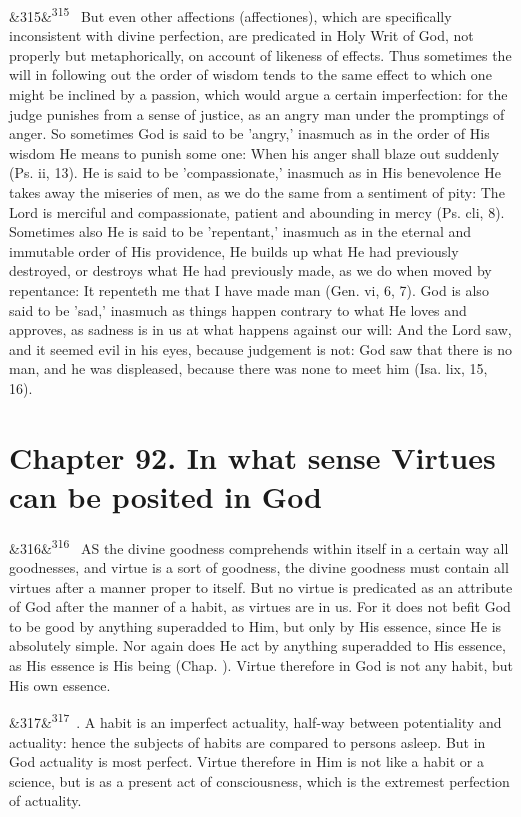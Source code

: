 \documentclass[12pt]{article}
\newcommand{\para}[1][]{\par\noindent\ifx&#1&\else\textsuperscript{\footnotesize #1}~\fi}
\begin{document}
\para[315] But even other affections (affectiones), which are specifically inconsistent with divine perfection, are predicated in Holy Writ of God, not properly but metaphorically, on account of likeness of effects. Thus sometimes the will in following out the order of wisdom tends to the same effect to which one might be inclined by a passion, which would argue a certain imperfection: for the judge punishes from a sense of justice, as an angry man under the promptings of anger. So sometimes God is said to be 'angry,' inasmuch as in the order of His wisdom He means to punish some one: When his anger shall blaze out suddenly (Ps. ii, 13). He is said to be 'compassionate,' inasmuch as in His benevolence He takes away the miseries of men, as we do the same from a sentiment of pity: The Lord is merciful and compassionate, patient and abounding in mercy (Ps. cli, 8). Sometimes also He is said to be 'repentant,' inasmuch as in the eternal and immutable order of His providence, He builds up what He had previously destroyed, or destroys what He had previously made, as we do when moved by repentance: It repenteth me that I have made man (Gen. vi, 6, 7). God is also said to be 'sad,' inasmuch as things happen contrary to what He loves and approves, as sadness is in us at what happens against our will: And the Lord saw, and it seemed evil in his eyes, because judgement is not: God saw that there is no man, and he was displeased, because there was none to meet him (Isa. lix, 15, 16).

\section*{Chapter 92. In what sense Virtues can be posited in God}

\para[316] AS the divine goodness comprehends within itself in a certain way all goodnesses, and virtue is a sort of goodness, the divine goodness must contain all virtues after a manner proper to itself. But no virtue is predicated as an attribute of God after the manner of a habit, as virtues are in us. For it does not befit God to be good by anything superadded to Him, but only by His essence, since He is absolutely simple. Nor again does He act by anything superadded to His essence, as His essence is His being (Chap. ). Virtue therefore in God is not any habit, but His own essence.

\para[317] 2. A habit is an imperfect actuality, half-way between potentiality and actuality: hence the subjects of habits are compared to persons asleep. But in God actuality is most perfect. Virtue therefore in Him is not like a habit or a science, but is as a present act of consciousness, which is the extremest perfection of actuality.
\end{document}
